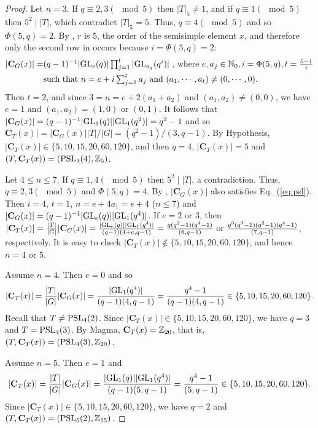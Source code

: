\documentclass[12pt,reqno]{amsart}
\def\C{\mathbf{C}}   \newcommand\Cay{\mathrm{Cay}}   \newcommand\Cos{\mathrm{Cos}} \newcommand{\CGammaSp}{\mathrm{C\Gamma Sp}}
\numberwithin {equation} {section}
\begin{document}
\begin{proof}
Let $n=3$. If $q \equiv 2,3(\mod 5)$ then $|T|_5\not=1$, and if $q \equiv 1(\mod 5)$ then $5^2 \mid |T|$, which contradict $|T|_5=5$. Thus, $q\equiv 4(\mod 5)$ and so $\Phi(5,q)=2$.
By \cite[Proposition 3.2.1]{B-G}, $r$ is $5$, the order of the semisimple element $x$, and therefore  only the second row in  \cite[Table B.3]{B-G} occurs because $i=\Phi(5,q)=2$:
 \begin{equation}\label{eq:psl}
 \begin{split}
 \textstyle |\C_G(x)|=&  \textstyle{(q-1)^{-1}|\GL_e(q)|\prod_{j=1}^{t}|\GL_{a_j}(q^i)|}  ~\text{,~where~} e,a_j \in \mathbb{N}_0, i=\Phi(5,q), \textstyle{t=\frac{5-1}{i}}  \\
 & \text{such~that~} \textstyle{n=e+i\sum_{j=1}^{t}a_j } \text{~and~} (a_1,\cdots,a_t) \neq (0,\cdots,0).
\end{split}
 \end{equation}
Then $t=2$, and since $3=n=e+2(a_1+a_2)$ and $(a_1,a_2) \neq (0,0)$, we have $e=1$ and $(a_1,a_2)=(1,0)$ or $(0,1)$. It follows that $|\C_G(x)|=(q-1)^{-1}|\GL_1(q)||\GL_1(q^2)|=q^2-1$ and so  $\C_T(x)|= |\C_G(x)||T|/|G|=(q^2-1)/(3,q-1)$.
By Hypothesis, $|\C_T(x)| \in \{5,10,15,20,60,120 \}$, and then $q=4$, $|\C_T(x)|=5$ and   $(T,\C_T(x))=(\PSL_3(4),\ZZ_5)$.

Let $4\leq n \leq 7$. If $q \equiv 1,4(\mod 5)$ then $5^2 \mid |T|$, a contradiction. Thus, $q \equiv 2,3(\mod 5)$ and $\Phi(5,q)=4$.
By \cite[Table B.3]{B-G}, $|\C_G(x)|$ also satisfies Eq.~(\ref{eq:psl}).  Then $i=4$, $t=1$, $n=e+4a_1=e+4$ ($n\leq 7$) and $|\C_G(x)|=(q-1)^{-1}|\GL_e(q)||\GL_1(q^4)|$.
If $e=2$ or $3$, then $|\C_T(x)|=\frac{|T|}{|G|}|\C_G(x)|=\frac{|\GL_e(q)||\GL_1(q^4)|}{(q-1)(4+e,q-1)}=\frac{q(q^2-1)(q^4-1)}{(6,q-1)} \text{~or~}\frac{q^3(q^3-1)(q^2-1)(q^4-1)}{(7,q-1)}$,
respectively. It is easy to check
$|\C_T(x)| \notin \{5,10,15,20,60,120 \}$, and hence $n=4$ or $5$.

Assume $n=4$. Then $e =0$ and so
\[ |\C_T(x)|=\frac{|T|}{|G|}|\C_G(x)|=\frac{|\GL_1(q^4)|}{(q-1)(4,q-1)}=\frac{q^4-1}{(q-1)(4,q-1)}\in \{5,10,15,20,60,120 \}.\]
Recall that $T \neq \mathrm{PSL}_4(2)$. Since $|\C_T(x)|\in \{5,10,15,20,60,120 \}$, we have $q=3$ and $T=\mathrm{PSL}_4(3)$. By {\sc Magma}, $\C_T(x)=\ZZ_{20}$, that is, $(T,\C_T(x))=(\PSL_4(3),\ZZ_{20})$.

Assume $n=5$. Then $e =1$ and
\[  |\C_T(x)|=\frac{|T|}{|G|}|\C_G(x)|=\frac{|\GL_1(q)||\GL_1(q^4)|}{(q-1)(5,q-1)}=\frac{q^4-1}{(5,q-1)}\in \{5,10,15,20,60,120 \}.\]
 Since $|\C_T(x)|\in \{5,10,15,20,60,120 \}$, we have $q=2$ and $(T,\C_T(x))=(\PSL_5(2), \ZZ_{15})$.



\end{proof}
\end{document}
